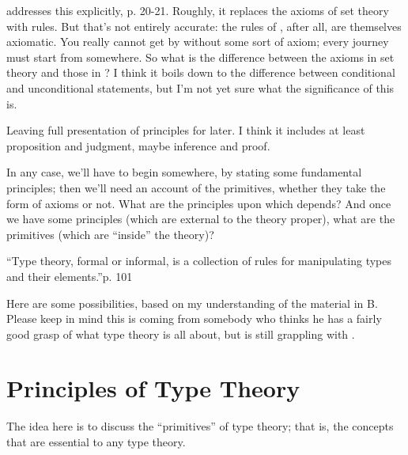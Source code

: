 \begin{ednote}
  \HoTTB addresses this explicitly, p. 20-21.  Roughly, it replaces
  the axioms of set theory with rules.  But that's not entirely
  accurate: the rules of \HoTT, after all, are themselves axiomatic.
  You really cannot get by without some sort of axiom; every journey
  must start from somewhere.  So what is the difference between the
  axioms in set theory and those in \tth?  I think it boils down to
  the difference between conditional and unconditional statements, but
  I'm not yet sure what the significance of this is.
\end{ednote}

\begin{ednote}
  Leaving full presentation of principles for later.  I think it
  includes at least proposition and judgment, maybe inference and
  proof.
\end{ednote}

In any case, we'll have to begin somewhere, by stating some
fundamental principles; then we'll need an account of the primitives,
whether they take the form of axioms or not.  What are the principles
upon which \HoTT{} depends?  And once we have some principles (which are
external to the theory proper), what are the primitives (which are
``inside'' the theory)?


\begin{ednote}
  ``Type theory, formal or informal, is a collection of rules for
  manipulating types and their elements.''\HoTTB p. 101
\end{ednote}

Here are some possibilities, based on my understanding of the material
in \HoTT{}B.  Please keep in mind this is coming from somebody who
thinks he has a fairly good grasp of what type theory is all about,
but is still grappling with \HoTT{}.

\section{Principles of Type Theory}
\label{subs:hottprinciples}

\begin{ednote}
  The idea here is to discuss the ``primitives'' of type theory; that
  is, the concepts that are essential to any type theory.
\end{ednote}

